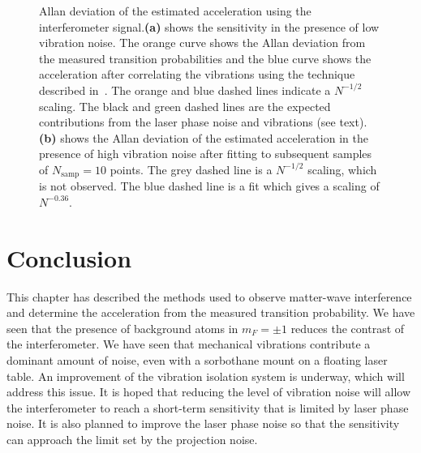 \begin{figure}[htpb!]
  \centering
  \caption[Comparison of Allan deviation in a high and
    low vibration
  environment.]{Allan deviation of the estimated acceleration using
    the interferometer signal.\textbf{(a)} shows
    the sensitivity in the presence of low vibration noise. The orange
    curve shows the Allan deviation from the measured transition
    probabilities and the blue curve shows the acceleration after
    correlating the vibrations using the technique described
    in~. The orange and blue
    dashed lines indicate a $N^{-1/2}$ scaling. The black and green
    dashed lines are the expected contributions from the laser phase
    noise and vibrations (see text). \textbf{(b)} shows
    the Allan deviation of the estimated acceleration in the presence
    of high vibration noise after fitting to subsequent samples of
    $N_\text{samp} = 10$ points. The grey dashed line is a
    $N^{-1/2}$ scaling, which is not observed. The blue dashed line
    is a fit which gives a scaling of $N^{-0.36}$.}
  \label{fig:adev_comparison}
\end{figure}

\section{Conclusion}
This chapter has described the methods used to observe matter-wave
interference and determine the acceleration from the measured transition
probability. We have seen that the presence of background atoms in $m_F = \pm 1$
reduces the contrast of the interferometer. We have seen that
mechanical vibrations contribute a dominant amount of noise, even with
a sorbothane mount on a floating laser table. An improvement of the vibration
isolation system is underway, which will address this issue. It is
hoped that reducing the level of vibration noise will allow the
interferometer to reach a short-term sensitivity that is limited by
laser phase noise.  It is also planned to improve the laser phase
noise so that the sensitivity can approach the limit set by the
projection noise.
